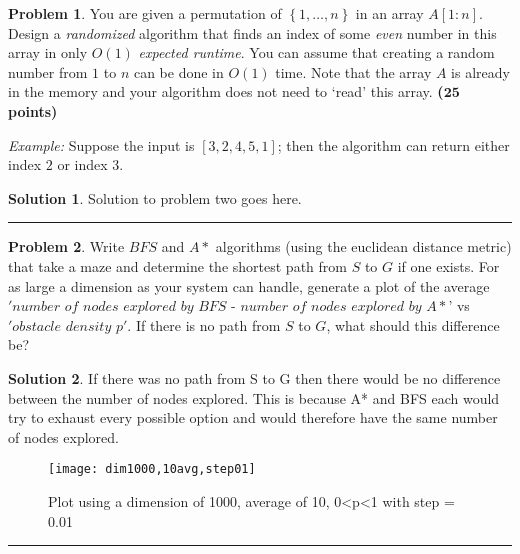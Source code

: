 \documentclass{article}
\theoremstyle{definition}
\newtheorem{problem}{Problem}
\def\fline{\rule{0.75\linewidth}{0.5pt}}
\newcommand{\finishline}{\vspace{-15pt}\begin{center}\fline\end{center}}
\newtheorem*{solution*}{Solution}
\newenvironment{solution}{\begin{solution*}}{{\finishline} \end{solution*}}
\newcommand{\grade}[1]{\hfill{\textbf{($\mathbf{#1}$ points)}}}
\newcommand{\set}[1]{\ensuremath{\left\{ #1 \right\}}}
\begin{document}
\begin{problem}
	You are given a permutation of $\set{1,\ldots,n}$ in an array $A[1:n]$. Design a \emph{randomized} algorithm that finds an index of some \emph{even} number 
	in this array in only $O(1)$ \emph{expected runtime}. You can assume that 
	creating a random number from $1$ to $n$ can be done in $O(1)$ time. Note that the array $A$ is already in the memory and your algorithm does not need to `read' this array.  \grade{25}
	
	\emph{Example:} Suppose the input is $[3,2,4,5,1]$; then the algorithm can return either index $2$ or index $3$. 	
\end{problem}

\smallskip

\begin{solution}
	Solution to problem two goes here. 
\end{solution}


\smallskip


\begin{problem}
	Write $BFS$ and $A*$ algorithms (using the euclidean distance metric) that take a maze and determine the shortest path from $S$ to $G$ if one exists. For as large a dimension as your system can handle, generate a plot of the average $'number$ $of$ $nodes$ $explored$ $by$ $BFS$ - $number$ $of$ $nodes$ $explored$ $by$ $A*$' vs $'obstacle$ $density$ $p'$. If there is no path from $S$ to $G$, what should this difference be? 
	
\end{problem}

\smallskip

\begin{solution}
    If there was no path from S to G then there would be no difference between the number of nodes explored. This is because A* and BFS each would try to exhaust every possible option and would therefore have the same number of nodes explored.
    
	\begin{figure}[h]
	\texttt{[image: dim1000,10avg,step01]}
	\caption{Plot using a dimension of 1000, average of 10, 0<p<1 with step = 0.01}
	\centering
	\end{figure}
	
\end{solution}

\smallskip
\end{document}
